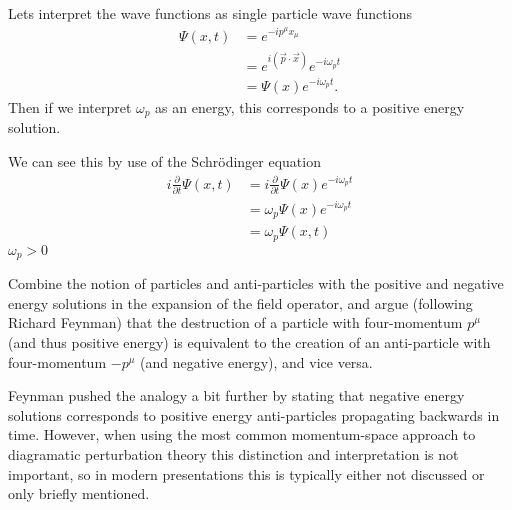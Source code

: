 \documentclass[working, oneside]{../../Preambles/tuftebook}
\begin{document}
\begin{solution}
Lets interpret the wave functions as single particle wave functions
\begin{align*}
\Psi(x,t) &= e^{- ip^{\mu }x_{\mu}} \\
&= e^{i (\vec{p} \cdot \vec{x})} e^{-i \omega_p t} \\
&= \Psi(x) e^{-i \omega_p t}.
\end{align*}
Then if we interpret $\omega_p$ as an energy, this corresponds to a positive energy solution.

We can see this by use of the Schrödinger equation
\begin{align*}
i \frac{\partial}{\partial t} \Psi(x,t) &= i \frac{\partial}{\partial t} \Psi(x) e^{-i \omega_p t} \\
&= \omega_p \Psi(x) e^{-i \omega_p t} \\
&= \omega_p \Psi(x,t)
\end{align*}
$\omega_p > 0$
\end{solution}
\begin{exercise}[9]
Combine the notion of particles and anti-particles with the positive and negative energy solutions in the expansion of the field operator, and argue (following Richard Feynman) that the destruction of a particle with four-momentum \( p^\mu \) (and thus positive energy) is equivalent to the creation of an anti-particle with four-momentum \( -p^\mu \) (and negative energy), and vice versa.

Feynman pushed the analogy a bit further by stating that negative energy solutions corresponds to positive energy anti-particles propagating backwards in time. However, when using the most common momentum-space approach to diagramatic perturbation theory this distinction and interpretation is not important, so in modern presentations this is typically either not discussed or only briefly mentioned.
\end{exercise}
\end{document}
